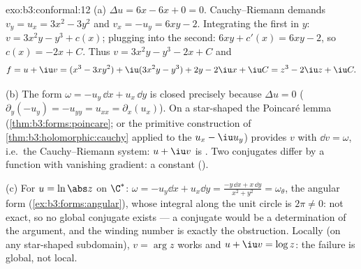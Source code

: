 \begin{solution}{exo:b3:conformal:12}
(a) $\Delta u = 6x - 6x + 0 = 0$. Cauchy--Riemann demands
$v_y = u_x = 3x^2 - 3y^2$ and $v_x = -u_y = 6xy - 2$.
Integrating the first in $y$: $v = 3x^2y - y^3 + c(x)$;
plugging into the second: $6xy + c'(x) = 6xy - 2$, so $c(x)
= -2x + C$. Thus $v = 3x^2y - y^3 - 2x + C$ and
\[
f = u + \iu v = (x^3 - 3xy^2) + \iu(3x^2y - y^3)
+ 2y - 2\iu x + \iu C = z^3 - 2\iu z + \iu C .
\]

(b) The form $\omega = -u_y\,\dd x + u_x\,\dd y$ is closed
precisely because $\Delta u = 0$ ($\partial_y(-u_y) =
-u_{yy} = u_{xx} = \partial_x(u_x)$). On a star-shaped  the Poincar\'e lemma (\cref{thm:b3:forms:poincare}; or
the primitive construction of
\cref{thm:b3:holomorphic:cauchy} applied to the 
$u_x - \iu u_y$) provides $v$ with $\dd v = \omega$, i.e.\
the Cauchy--Riemann system: $u + \iu v$ is . Two
conjugates differ by a function with vanishing gradient: a
constant ().

(c) For $u = \ln\abs z$ on $\C^*$: $\omega = -u_y\dd x +
u_x\dd y = \frac{-y\,\dd x + x\,\dd y}{x^2 + y^2} =
\omega_\theta$, the angular form
(\cref{ex:b3:forms:angular}), whose integral along the unit
circle is $2\pi \neq 0$: not exact, so no global conjugate
exists --- a conjugate would be a  determination
of the argument, and the winding number is exactly the
obstruction. Locally (on any star-shaped subdomain), $v =
\arg z$ works and $u + \iu v = \log z$: the failure is
global, not local.
\end{solution}

